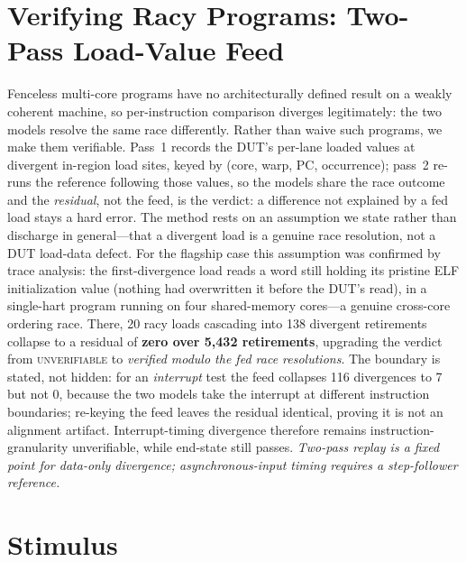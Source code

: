 \documentclass[conference]{IEEEtran}
\begin{document}
\section{Verifying Racy Programs: Two-Pass Load-Value Feed}
\label{sec:loadfeed}

Fenceless multi-core programs have no architecturally defined result on
a weakly coherent machine, so per-instruction comparison diverges
legitimately: the two models resolve the same race differently. Rather
than waive such programs, we make them verifiable. Pass~1 records the
DUT's per-lane loaded values at divergent in-region load sites, keyed
by (core, warp, PC, occurrence); pass~2 re-runs the reference following
those values, so the models share the race outcome and the
\emph{residual}, not the feed, is the verdict: a difference not
explained by a fed load stays a hard error. The method rests on an
assumption we state rather than discharge in general---that a divergent
load is a genuine race resolution, not a DUT load-data defect. For the
flagship case this assumption was confirmed by trace analysis: the
first-divergence load reads a word still holding its pristine ELF
initialization value (nothing had overwritten it before the DUT's
read), in a single-hart program running on four shared-memory
cores---a genuine cross-core ordering race. There, 20 racy loads
cascading into 138 divergent retirements collapse to a residual of
\textbf{zero over 5{,}432 retirements}, upgrading the verdict from
\textsc{unverifiable} to \emph{verified modulo the fed race
	resolutions}. The boundary is stated, not hidden:
for an \emph{interrupt} test the feed collapses 116 divergences to 7
but not 0, because the two models take the interrupt at different
instruction boundaries; re-keying the feed leaves the residual
identical, proving it is not an alignment artifact. Interrupt-timing
divergence therefore remains instruction-granularity unverifiable,
while end-state still passes. \emph{Two-pass replay is a fixed point
	for data-only divergence; asynchronous-input timing requires a
	step-follower reference.}

\section{Stimulus}
\label{sec:stimulus}
\end{document}
